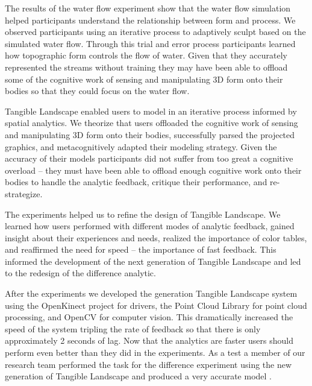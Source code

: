 \documentclass[prodmode,acmtochi]{acmsmall} %
\begin{document}
The results of the water flow experiment show 
that the water flow simulation helped participants 
understand the relationship between form and process.
We observed participants using an iterative process
to adaptively sculpt based on the simulated water flow. 
Through this trial and error process 
participants learned how
topographic form controls the flow of water.
%
Given that they accurately represented the streams without training
they may have been able to offload 
some of the cognitive work of sensing and manipulating 
3D form onto their bodies so that 
they could focus on the water flow. 

Tangible Landscape enabled users 
to model in an iterative process informed by spatial analytics. %
%
We theorize that users offloaded the cognitive work 
of sensing and manipulating 3D form onto their bodies,
successfully parsed the projected graphics,
and metacognitively adapted their modeling strategy.
%
Given the accuracy of their models 
participants did not suffer from too great a cognitive overload 
-- they must have been able to offload enough cognitive work onto their bodies
to handle the analytic feedback, critique their performance, and re-strategize.

The experiments helped us to refine the design of Tangible Landscape. 
%
We learned how users performed with different modes of analytic feedback, 
gained insight about their experiences and needs,
realized the importance of color tables, 
and reaffirmed the need for speed -- the importance of fast feedback. 
%
This informed the development of the next generation of Tangible Landscape 
and led to the redesign of the difference analytic. 

After the experiments
we developed the  generation Tangible Landscape system
using 
the OpenKinect project for drivers,
the Point Cloud Library for point cloud processing, 
and OpenCV for computer vision. 
%
This dramatically increased the speed of the system
tripling the rate of feedback
so that there is only approximately 2 seconds of lag. 
%
Now that the analytics are faster 
users should perform even better than they did in the experiments.
%
As a test a member of our research team 
performed the task for the difference experiment 
using the new generation of Tangible Landscape
and produced a very accurate model \cite{ncsu_geoforall_2016}. 

\end{document}
